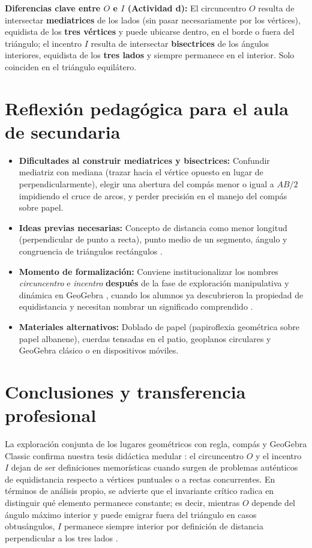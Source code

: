 \documentclass[spanish,letterpaper,oneside]{article}
\begin{document}
\textbf{Diferencias clave entre $O$ e $I$ (Actividad d):} El circuncentro $O$ resulta de intersectar \textbf{mediatrices} de los lados (sin pasar necesariamente por los vértices), equidista de los \textbf{tres vértices} y puede ubicarse dentro, en el borde o fuera del triángulo; el incentro $I$ resulta de intersectar \textbf{bisectrices} de los ángulos interiores, equidista de los \textbf{tres lados} y siempre permanece en el interior. Solo coinciden en el triángulo equilátero.

\section{Reflexión pedagógica para el aula de secundaria}
\begin{itemize}
  \item \textbf{Dificultades al construir mediatrices y bisectrices:} Confundir mediatriz con mediana (trazar hacia el vértice opuesto en lugar de perpendicularmente), elegir una abertura del compás menor o igual a $AB/2$ impidiendo el cruce de arcos, y perder precisión en el manejo del compás sobre papel.
  \item \textbf{Ideas previas necesarias:} Concepto de distancia como menor longitud (perpendicular de punto a recta), punto medio de un segmento, ángulo y congruencia de triángulos rectángulos \citep{euclides_elementos}.
  \item \textbf{Momento de formalización:} Conviene institucionalizar los nombres \textit{circuncentro} e \textit{incentro} \textbf{después} de la fase de exploración manipulativa y dinámica en GeoGebra \citep{hohenwarter2009}, cuando los alumnos ya descubrieron la propiedad de equidistancia y necesitan nombrar un significado comprendido \citep{duval2006}.
  \item \textbf{Materiales alternativos:} Doblado de papel (papiroflexia geométrica sobre papel albanene), cuerdas tensadas en el patio, geoplanos circulares y GeoGebra clásico o en dispositivos móviles.
\end{itemize}

\clearpage
\section{Conclusiones y transferencia profesional}
La exploración conjunta de los lugares geométricos con regla, compás y GeoGebra Classic confirma nuestra tesis didáctica medular \citep{iiiepe2026_s9,hohenwarter2009}: el circuncentro $O$ y el incentro $I$ dejan de ser definiciones memorísticas cuando surgen de problemas auténticos de equidistancia respecto a vértices puntuales o a rectas concurrentes. En términos de análisis propio, se advierte que el invariante crítico radica en distinguir qué elemento permanece constante; es decir, mientras $O$ depende del ángulo máximo interior y puede emigrar fuera del triángulo en casos obtusángulos, $I$ permanece siempre interior por definición de distancia perpendicular a los tres lados \citep{duval2006}.
\end{document}
